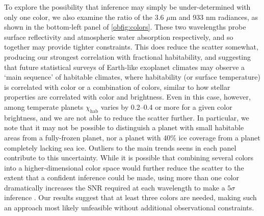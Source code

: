 \documentclass[fleqn,usenatbib]{mnras}
\begin{document}
To explore the possibility that inference may simply be under-determined with only one color, we also examine the ratio of the 3.6 $\mu$m and 933 nm radiances, as shown in the bottom-left panel of \autoref{obfig:colors}. These two wavelengths probe surface reflectivity and atmospheric water absorption respectively, and so together may provide tighter constraints. This does reduce the scatter somewhat, producing our strongest correlation with fractional habitability, and suggesting that future statistical surveys of Earth-like exoplanet climates may observe a `main sequence' of habitable climates, where habitability (or surface temperature) is correlated with color or a combination of colors, similar to how stellar properties are correlated with color and brightness. Even in this case, however, among temperate planets $\chi_\text{hab}$ varies by 0.2--0.4 or more for a given color brightness, and we are not able to reduce the scatter further. In particular, we note that it may not be possible to distinguish a planet with small habitable areas from a fully-frozen planet, nor a planet with 40\% ice coverage from a planet completely lacking sea ice. Outliers to the main trends seens in each panel contribute to this uncertainty. While it is possible that combining several colors into a higher-dimensional color space would further reduce the scatter to the extent that a confident inference could be made, using more than one color dramatically increases the SNR required at each wavelength to make a $5\sigma$ inference \citep{Krissansen-Totton2016}. Our results suggest that at least three colors are needed, making such an approach most likely unfeasible without additional observational constraints.
\end{document}
